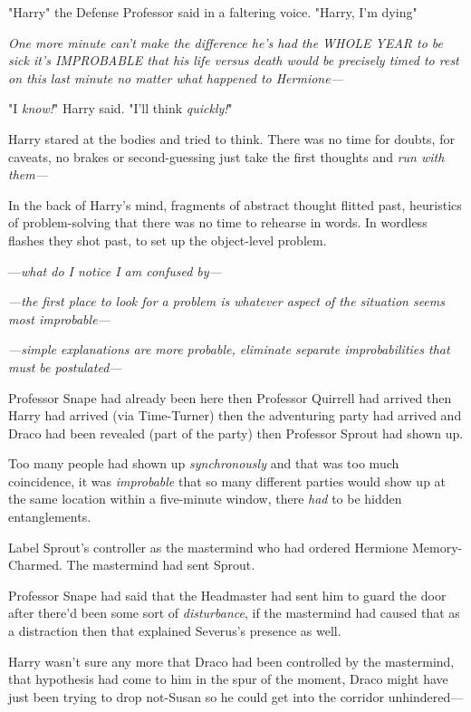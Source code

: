 "Harry{\el}" the Defense Professor said in a faltering voice. "Harry, I'm
dying{\el}"

\emph{One more minute can't make the difference he's had the WHOLE YEAR to be
sick it's IMPROBABLE that his life versus death would be precisely timed to
rest on this last minute no matter what happened to Hermione—}

"I \emph{know!}" Harry said. "I'll think \emph{quickly!}"

Harry stared at the bodies and tried to think. There was no time for doubts,
for caveats, no brakes or second-guessing just take the first thoughts and
\emph{run with them—}

In the back of Harry's mind, fragments of abstract thought flitted past,
heuristics of problem-solving that there was no time to rehearse in words. In
wordless flashes they shot past, to set up the object-level problem.

—\emph{what do I notice I am confused by—}

\emph{—the first place to look for a problem is whatever aspect of the
situation seems most improbable—}

\emph{—simple explanations are more probable, eliminate separate
improbabilities that must be postulated—}

Professor Snape had already been here then Professor Quirrell had arrived then
Harry had arrived (via Time-Turner) then the adventuring party had arrived and
Draco had been revealed (part of the party) then Professor Sprout had shown up.

Too many people had shown up \emph{synchronously} and that was too much
coincidence, it was \emph{improbable} that so many different parties would show
up at the same location within a five-minute window, there \emph{had} to be
hidden entanglements.

Label Sprout's controller as the mastermind who had ordered Hermione
Memory-Charmed. The mastermind had sent Sprout.

Professor Snape had said that the Headmaster had sent him to guard the door
after there'd been some sort of \emph{disturbance}, if the mastermind had
caused that as a distraction then that explained Severus's presence as well.

Harry wasn't sure any more that Draco had been controlled by the mastermind,
that hypothesis had come to him in the spur of the moment, Draco might have
just been trying to drop not-Susan so he could get into the corridor unhindered—

